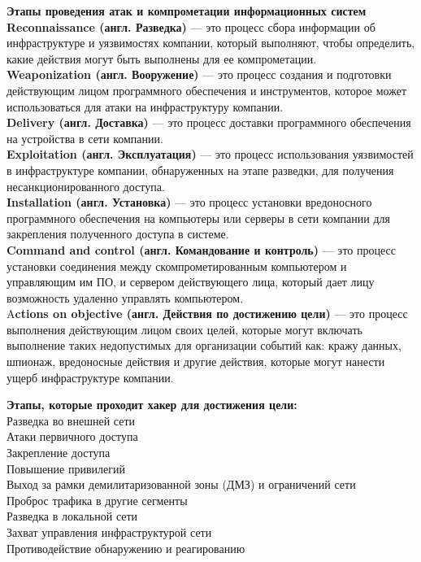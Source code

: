 	\par \textbf{Этапы проведения атак и компрометации информационных систем}
	\\
	\textbf{Reconnaissance (англ. Разведка)} — это процесс сбора информации об инфраструктуре и уязвимостях компании, который выполняют, чтобы определить, какие действия могут быть выполнены для ее компрометации.
	\\
	\textbf{Weaponization (англ. Вооружение)} — это процесс создания и подготовки действующим лицом программного обеспечения и инструментов, которое может использоваться для атаки на инфраструктуру компании.
	\\
	\textbf{Delivery (англ. Доставка)} — это процесс доставки программного обеспечения на устройства в сети компании.
	\\
	\textbf{Exploitation (англ. Эксплуатация)} — это процесс использования уязвимостей в инфраструктуре компании, обнаруженных на этапе разведки, для получения несанкционированного доступа.
	\\
	\textbf{Installation (англ. Установка)} — это процесс установки вредоносного программного обеспечения на компьютеры или серверы в сети компании для закрепления полученного доступа в системе.
	\\
	\textbf{Command and control (англ. Командование и контроль)} — это процесс установки соединения между скомпрометированным компьютером и управляющим им ПО, и сервером действующего лица, который дает лицу возможность удаленно управлять компьютером.
	\\
	A\textbf{ctions on objective (англ. Действия по достижению цели)} — это процесс выполнения действующим лицом своих целей, которые могут включать выполнение таких недопустимых для организации событий как: кражу данных, шпионаж, вредоносные действия и другие действия, которые могут нанести ущерб инфраструктуре компании.
	
	\par \textbf{Этапы, которые проходит хакер для достижения цели:}
	\\
	Разведка во внешней сети
	\\
	Атаки первичного доступа
	\\
	Закрепление доступа  
	\\
	Повышение привилегий
	\\
	Выход за рамки демилитаризованной зоны (ДМЗ) и ограничений сети
	\\
	Проброс трафика в другие сегменты
	\\
	Разведка в локальной сети
	\\
	Захват управления инфраструктурой сети
	\\
	Противодействие обнаружению и реагированию
	
